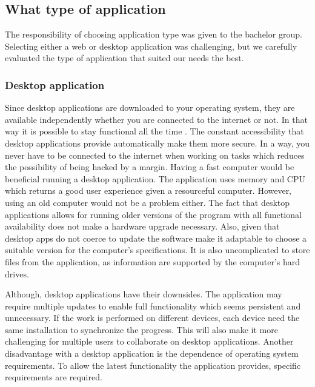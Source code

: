 \subsection{What type of application}
The responsibility of choosing application type was given to the bachelor group. Selecting either a web or desktop application was challenging, but we carefully evaluated the type of application that suited our needs the best. 

\subsubsection*{Desktop application}
Since desktop applications are downloaded to your operating system, they are available independently whether you are connected to the internet or not. In that way it is possible to stay functional all the time \cite{WebVsDesktop}. The constant accessibility that desktop applications provide automatically make them more secure. In a way, you never have to be connected to the internet when working on tasks which reduces the possibility of being hacked by a margin. Having a fast computer would be beneficial running a desktop application. The application uses memory and CPU which returns a good user experience given a resourceful computer. However, using an old computer would not be a problem either. The fact that desktop applications allows for running older versions of the program with all functional availability does not make a hardware upgrade necessary. Also, given that desktop apps do not coerce to update the software make it adaptable to choose a suitable version for the computer's specifications. It is also uncomplicated to store files from the application, as information are supported by the computer's hard drives. 

Although, desktop applications have their downsides. The application may require multiple updates to enable full functionality which seems persistent and unnecessary. If the work is performed on different devices, each device need the same installation to synchronize the progress. This will also make it more challenging for multiple users to collaborate on desktop applications. Another disadvantage with a desktop application is the dependence of operating system requirements. To allow the latest functionality the application provides, specific requirements are required. 

